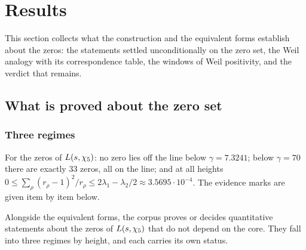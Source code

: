 \section{Results}\label{sec:results}

This section collects what the construction and the equivalent forms establish about the zeros:
the statements settled unconditionally on the zero set, the Weil analogy with its
correspondence table, the windows of Weil positivity, and the verdict that remains.

\subsection{What is proved about the zero set}\label{sec:results-zeros}

\subsubsection{Three regimes}\label{ssec:three-regimes}

\begin{proposition}\label{prop:three-regimes}
For the zeros of $L(s,\chi_5)$: no zero lies off the line below $\gamma=7.3241$;
below $\gamma=70$ there are exactly $33$ zeros, all on the line; and at all heights
$0\le\sum_\rho(r_\rho-1)^2/r_\rho\le2\lambda_1-\lambda_2/2\approx3.5695\cdot10^{-4}$.  The evidence marks are
given item by item below.
%
\end{proposition}

Alongside the equivalent forms, the corpus proves or decides quantitative statements about
the zeros of $L(s,\chi_5)$ that do not depend on the core.  They fall into three
regimes by height, and each carries its own status.

